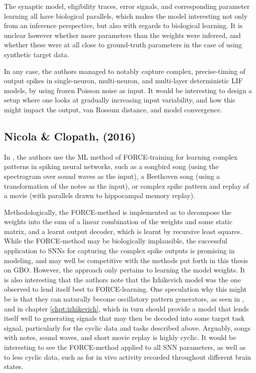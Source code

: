 \documentclass[mphil,deptreport,ianc]{infthesis} %
\begin{document}
The synaptic model, eligibility traces, error signals, and corresponding parameter learning all have biological parallels, which makes the model interesting not only from an inference perspective, but also with regards to biological learning.
It is unclear however whether more parameters than the weights were inferred, and whether these were at all close to ground-truth parameters in the case of using synthetic target data.

In any case, the authors managed to notably capture complex, precise-timing of output spikes in single-neuron, multi-neuron, and multi-layer deterministic LIF models, by using frozen Poisson noise as input.
It would be interesting to design a setup where one looks at gradually increasing input variability, and how this might impact the output, van Rossum distance, and model convergence.


\subsection{Nicola \& Clopath, (2016)}

In \cite{Nicola2016}, the authors use the ML method of FORCE-training for learning complex patterns in spiking neural networks, such as a songbird song (using the spectrogram over sound waves as the input), a Beethoven song (using a transformation of the notes as the input), or complex spike pattern and replay of a movie (with parallels drawn to hippocampal memory replay).

Methodologically, the FORCE-method is implemented as to decompose the weights into the sum of a linear combination of the weights and some static matrix, and a learnt output decoder, which is learnt by recursive least squares.
While the FORCE-method may be biologically implausible, the successful application to SNNs for capturing the complex spike outputs is promising in modeling, and may well be competitive with the methods put forth in this thesis on GBO.
However, the approach only pertains to learning the model weights.
It is also interesting that the authors note that the Izhikevich model was the one observed to lend itself best to FORCE-learning.
One speculation why this might be is that they can naturally become oscillatory pattern generators, as seen in \cite{Oliveira2019}, and in chapter \ref{chpt:izhikevich}, which in turn should provide a model that lends itself well to generating signals that may then be decoded into some target task signal, particularly for the cyclic data and tasks described above. Arguably, songs with notes, sound waves, and short movie replay is highly cyclic.
It would be interesting to see the FORCE-method applied to all SNN parameters, as well as to less cyclic data, such as for in vivo activity recorded throughout different brain states.
\end{document}
